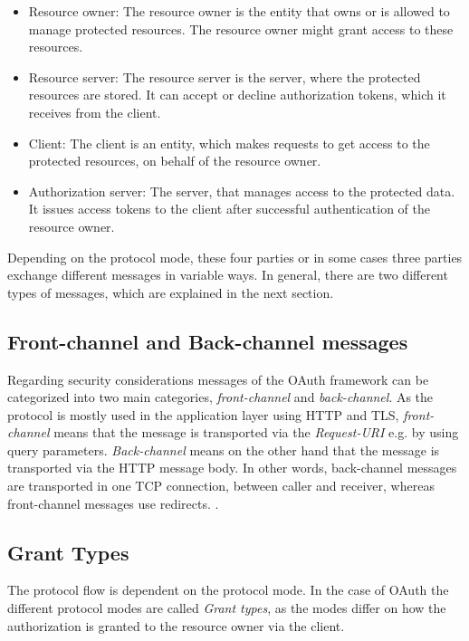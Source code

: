 \documentclass[
    fontsize=12pt,
    headings=small,
    parskip=half,           %
    bibliography=totoc,
    numbers=noenddot,       %
    open=any,               %
    ]{scrreprt}
\begin{document}
\begin{itemize} 

    \item Resource owner: The resource owner is the entity that owns or is
        allowed to manage protected resources. The resource owner might grant
        access to these resources. 

    \item Resource server: The resource server is the server, where the
        protected resources are stored. It can accept or decline authorization
        tokens, which it receives from the client. 

    \item Client: The client is an entity, which makes requests to get access
        to the protected resources, on behalf of the resource owner. 
        
    \item Authorization server: The server, that manages access to the
        protected data. It issues access tokens to the client after successful
        authentication of the resource owner. 

\end{itemize}

Depending on the protocol mode, these four parties or in some cases three
parties exchange different messages in variable ways. In general, there are two
different types of messages, which are explained in the next section.

\subsection{Front-channel and Back-channel messages}

Regarding security considerations messages of the OAuth framework can be
categorized into two main categories, \emph{front-channel} and
\emph{back-channel}. As the protocol is mostly used in the application layer
using HTTP and TLS, \emph{front-channel} means that the message is transported
via the \emph{Request-URI} \cite[Sec. 5.1.2]{fielding1999hypertext} e.g. by
using query parameters. \emph{Back-channel} means on the other hand that the
message is transported via the HTTP message body. In other words, back-channel
messages are transported in one TCP connection, between caller and receiver,
whereas front-channel messages use redirects. \cite[p. 338]{belfaik2022single}.

\subsection{Grant Types}
The protocol flow is dependent on the protocol mode. In the case of OAuth the
different protocol modes are called \emph{Grant types}, as the modes differ on
how the authorization is granted to the resource owner via the client.
\end{document}
